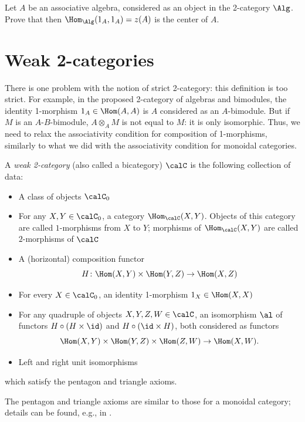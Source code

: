 \begin{exercise}\label{ec:algebra-in-2cat}
  Let $A$ be an associative algebra, considered as an object in the 2-category
  $\Alg$. Prove that then $\Hom_{\Alg}(1_A, 1_A)=z(A)$ is the center of $A$.
\end{exercise}
\section{Weak 2-categories}\label{s:weak-2cat}
There is one problem with the notion of strict 2-category: this definition is
too strict. For example, in the proposed 2-category of algebras and bimodules,
the identity 1-morphism $1_A\in \Hom(A,A)$ is $A$ considered as an $A$-bimodule.
But if $M$ is an $A$-$B$-bimodule, $A\otimes_A M$ is not equal to $M$: it is only
isomorphic. Thus, we need to relax the associativity condition for composition
of 1-morphisms, similarly to what we did with the associativity condition for
monoidal categories.

\begin{definition}\label{d:2-cat-weak}
  A \emph{weak 2-category} (also called a bicategory) $\calC$ is the following
  collection of data:
  \begin{itemize}
    \item A class of objects $\calC_0$
    \item For any $X, Y\in \calC_0$, a category $\Hom_\calC(X,Y)$. Objects of
      this category are called $1$-morphisms from $X$ to $Y$; morphisms of
      $\Hom_\calC(X,Y)$ are called $2$-morphisms of $\calC$
    \item A (horizontal) composition functor
      $$
        H\colon \Hom(X,Y)\times \Hom(Y,Z)\to \Hom(X,Z)
      $$
    \item For every $X\in \calC_0$, an identity 1-morphism $1_X\in \Hom(X,X)$
    \item For any quadruple of objects $X,Y,Z,W\in \calC$, an isomorphism
      $\al$ of functors $H\circ (H\times \id)$ and $H\circ (\id \times H)$,
      both considered as functors
      $$
        \Hom(X,Y)\times \Hom(Y,Z)\times\Hom(Z,W)\to \Hom(X,W).
      $$
    \item Left and right unit isomorphisms
  \end{itemize}
  which satisfy the pentagon and triangle axioms.
\end{definition}
The pentagon and triangle axioms are similar to those for a monoidal category;
details can be found, e.g., in \cite[Section 1.5]{leinster}.


